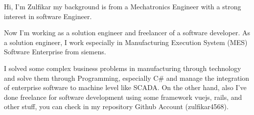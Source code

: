 

\begin{cvparagraph}

Hi, I'm Zulfikar my background is from a Mechatronics Engineer with a strong interest in software Engineer. 

Now I'm working as a solution engineer and freelancer of a software developer. As a solution engineer, I work especially in Manufacturing Execution System (MES) Software Enterprise from siemens. 

I solved some complex business problems in manufacturing through technology and solve them through Programming, especially C\# and manage the integration of enterprise software to machine level like SCADA. On the other hand, also I've done freelance for software development using some framework vuejs, rails, and other stuff, you can check in my repository Github Account (zulfikar4568).
\end{cvparagraph}
